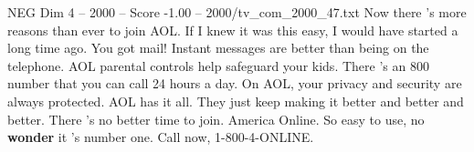 \begin{textsample}{NEG Dim 4 – 2000 – Score -1.00 – 2000/tv\_com\_2000\_47.txt}  \label{ex:f4_neg_027}
Now there 's more reasons than ever to join AOL.
If I knew it was this easy, I would have started a long time ago.
You got mail!
Instant messages are better than being on the telephone.
AOL parental controls help safeguard your kids.
There 's an 800 number that you can call 24 hours a day.
On AOL, your privacy and security are always protected.
AOL has it all.
They just keep making it better and better and better.
There 's no better time to join.
America Online.
So easy to use, no \textbf{wonder} it 's number one.
Call now, 1-800-4-ONLINE.

\end{textsample}
